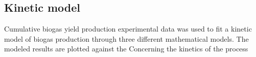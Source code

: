 \subsection{Kinetic model}
Cumulative biogas yield production experimental data was used to fit a kinetic model of biogas production through three different mathematical models. The modeled results are plotted against the
Concerning the kinetics of the process